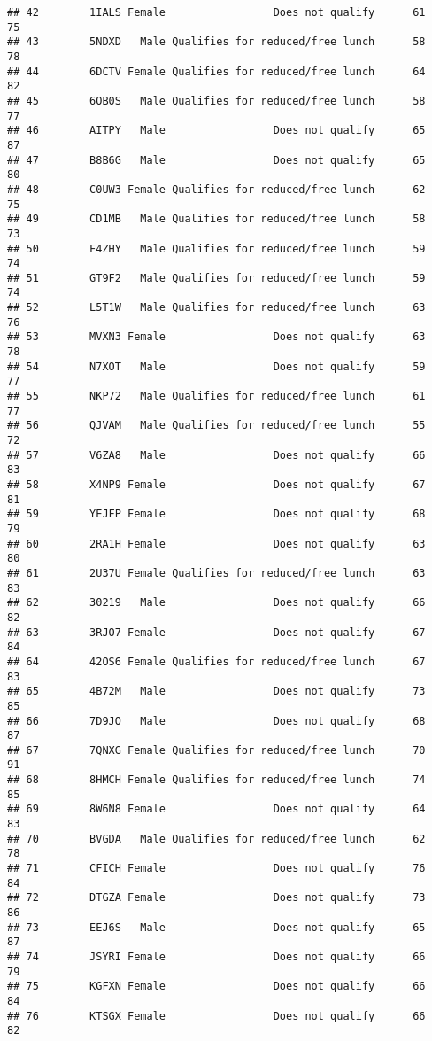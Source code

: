 \documentclass[
]{article}
\begin{document}
\begin{verbatim}
## 42        1IALS Female                 Does not qualify      61       75
## 43        5NDXD   Male Qualifies for reduced/free lunch      58       78
## 44        6DCTV Female Qualifies for reduced/free lunch      64       82
## 45        6OB0S   Male Qualifies for reduced/free lunch      58       77
## 46        AITPY   Male                 Does not qualify      65       87
## 47        B8B6G   Male                 Does not qualify      65       80
## 48        C0UW3 Female Qualifies for reduced/free lunch      62       75
## 49        CD1MB   Male Qualifies for reduced/free lunch      58       73
## 50        F4ZHY   Male Qualifies for reduced/free lunch      59       74
## 51        GT9F2   Male Qualifies for reduced/free lunch      59       74
## 52        L5T1W   Male Qualifies for reduced/free lunch      63       76
## 53        MVXN3 Female                 Does not qualify      63       78
## 54        N7XOT   Male                 Does not qualify      59       77
## 55        NKP72   Male Qualifies for reduced/free lunch      61       77
## 56        QJVAM   Male Qualifies for reduced/free lunch      55       72
## 57        V6ZA8   Male                 Does not qualify      66       83
## 58        X4NP9 Female                 Does not qualify      67       81
## 59        YEJFP Female                 Does not qualify      68       79
## 60        2RA1H Female                 Does not qualify      63       80
## 61        2U37U Female Qualifies for reduced/free lunch      63       83
## 62        30219   Male                 Does not qualify      66       82
## 63        3RJO7 Female                 Does not qualify      67       84
## 64        42OS6 Female Qualifies for reduced/free lunch      67       83
## 65        4B72M   Male                 Does not qualify      73       85
## 66        7D9JO   Male                 Does not qualify      68       87
## 67        7QNXG Female Qualifies for reduced/free lunch      70       91
## 68        8HMCH Female Qualifies for reduced/free lunch      74       85
## 69        8W6N8 Female                 Does not qualify      64       83
## 70        BVGDA   Male Qualifies for reduced/free lunch      62       78
## 71        CFICH Female                 Does not qualify      76       84
## 72        DTGZA Female                 Does not qualify      73       86
## 73        EEJ6S   Male                 Does not qualify      65       87
## 74        JSYRI Female                 Does not qualify      66       79
## 75        KGFXN Female                 Does not qualify      66       84
## 76        KTSGX Female                 Does not qualify      66       82

\end{verbatim}
\end{document}
